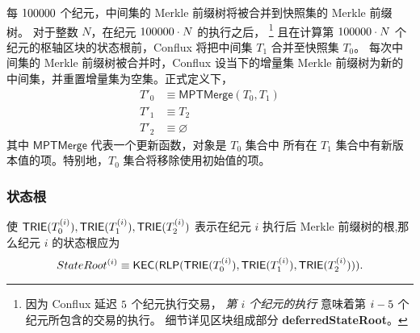 每 $100000$ 个纪元，中间集的 Merkle 前缀树将被合并到快照集的 Merkle 前缀树。
对于整数 $N$，在纪元 $100000\cdot N$ 的执行之后，
\footnote{因为 Conflux 延迟 ${5}$ 个纪元执行交易， \emph{第 $i$ 个纪元的执行} 意味着第 $i-{5}$ 个纪元所包含的交易的执行。 细节详见区块组成部分 {\bf deferredStateRoot}。}
且在计算第 $100000\cdot N$ 个纪元的枢轴区块的状态根前，Conflux 将把中间集 $T_1$ 合并至快照集 $T_0$。 
每次中间集的 Merkle 前缀树被合并时，Conflux 设当下的增量集 Merkle 前缀树为新的中间集，并重置增量集为空集。正式定义下，
\begin{align}
	T'_0 &\equiv \mathsf{MPTMerge}(T_0,T_1) \\
	T'_1 &\equiv T_2 \\
	T'_2 &\equiv \varnothing
\end{align}
%
其中 $\mathsf{MPTMerge}$ 代表一个更新函数，对象是 $T_0$ 集合中 所有在 $T_1$ 集合中有新版本值的项。特别地，$T_0$ 集合将移除使用初始值的项。


\subsubsection{状态根}

使 $\mathsf{TRIE}(T^{(i)}_0),\mathsf{TRIE}(T^{(i)}_1),\mathsf{TRIE}(T^{(i)}_2)$ 表示在纪元 $i$ 执行后 Merkle 前缀树的根,那么纪元 $i$ 的状态根应为
%
$$ StateRoot^{(i)}\equiv\mathsf{KEC}(\mathsf{RLP}(\mathsf{TRIE}(T^{(i)}_0),\mathsf{TRIE}(T^{(i)}_1),\mathsf{TRIE}(T^{(i)}_2))).$$


